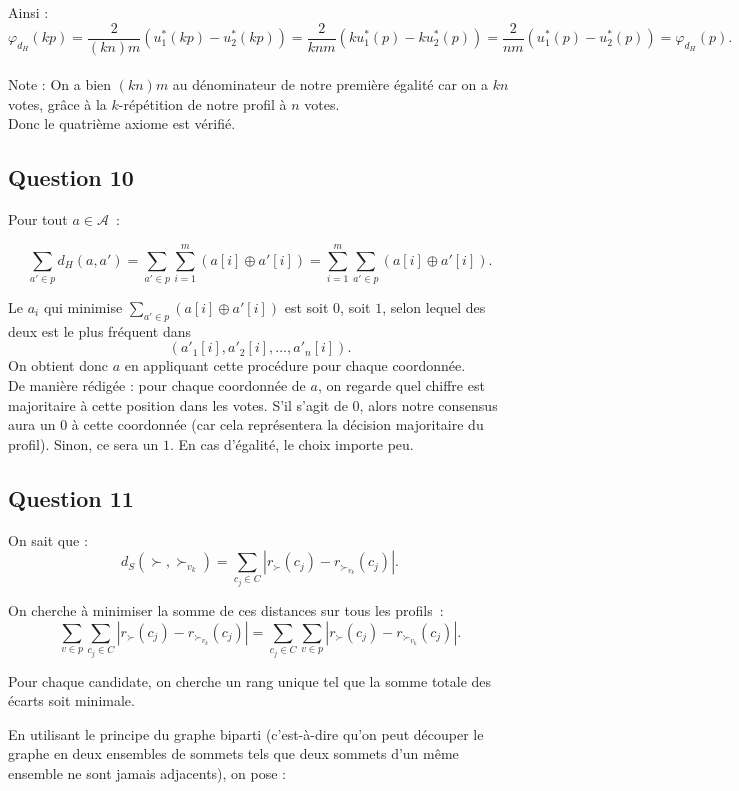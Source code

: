 \documentclass[11pt]{article}
\begin{document}
Ainsi :
\[
\varphi_{d_H}(k p)
= \frac{2}{(k n) m}(u_1^*(k p) - u_2^*(k p))
= \frac{2}{k n m}(k u_1^*(p) - k u_2^*(p))
= \frac{2}{n m}(u_1^*(p) - u_2^*(p))
= \varphi_{d_H}(p).
\]
\\

Note : On a bien $(kn)m$ au dénominateur de notre première égalité car on a $kn$ votes, grâce à la $k$-répétition de notre profil à $n$ votes.
\\

Donc le quatrième axiome est vérifié.


\subsection{Question 10}

Pour tout $a \in \mathcal{A}$~:

\[
\sum_{a' \in p} d_H(a,a') 
= \sum_{a' \in p} \sum_{i=1}^m (a[i] \oplus a'[i])
= \sum_{i=1}^m \sum_{a' \in p} (a[i] \oplus a'[i]).
\]

Le $a_i$ qui minimise $\sum_{a' \in p} (a[i] \oplus a'[i])$ est soit $0$, soit $1$, selon lequel des deux est le plus fréquent dans 
\[
(a'_{1}[i], a'_{2}[i], \ldots, a'_{n}[i]).
\]
On obtient donc $a$ en appliquant cette procédure pour chaque coordonnée.
\\

De manière rédigée :  
pour chaque coordonnée de $a$, on regarde quel chiffre est majoritaire à cette position dans les votes.  
S’il s’agit de $0$, alors notre consensus aura un $0$ à cette coordonnée (car cela représentera la décision majoritaire du profil).  
Sinon, ce sera un $1$.  
En cas d’égalité, le choix importe peu.


\subsection{Question 11}

On sait que :
\[
d_S(\succ, \succ_{v_k}) 
= \sum_{c_j \in C} |r_\succ(c_j) - r_{\succ_{v_k}}(c_j)|.
\]

On cherche à minimiser la somme de ces distances sur tous les profils~:
\[
\sum_{v \in p} \sum_{c_j \in C} 
|r_\succ(c_j) - r_{\succ_{v_k}}(c_j)|
= 
\sum_{c_j \in C} \sum_{v \in p} 
|r_\succ(c_j) - r_{\succ_{v_k}}(c_j)|.
\]

Pour chaque candidate, on cherche un rang unique tel que la somme totale des écarts soit minimale.

En utilisant le principe du graphe biparti (c’est-à-dire qu’on peut découper le graphe en deux ensembles de sommets tels que deux sommets d’un même ensemble ne sont jamais adjacents),  
on pose :
\end{document}

